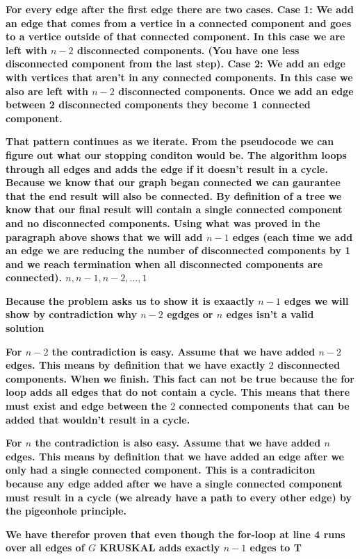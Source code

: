 \documentclass[addpoints]{exam}
\def\mysolution#1{}    %
\begin{document}
\begin{questions}
\textbf{For every edge after the first edge there are two cases. Case 1: We add an edge that comes from a vertice in a connected component and goes to a vertice outside of that connected component. In this case we are left with $n-2$ disconnected components. (You have one less disconnected component from the last step). Case 2: We add an edge with vertices that aren't in any connected components. In this case we also are left with $n-2$ disconnected components. Once we add an edge between 2 disconnected components they become 1 connected component.}

\textbf{That pattern continues as we iterate. From the pseudocode we can figure out what our stopping conditon would be. The algorithm loops through all edges and adds the edge if it doesn't result in a cycle. Because we know that our graph began connected we can gaurantee that the end result will also be connected. By definition of a tree we know that our final result will contain a single connected component and no disconnected components. Using what was proved in the paragraph above shows that we will add $n-1$ edges (each time we add an edge we are reducing the number of disconnected components by 1 and we reach termination when all disconnected components are connected). $n,n-1,n-2,...,1$}

\textbf{Because the problem asks us to show it is exaactly $n-1$ edges we will show by contradiction why $n-2$ egdges or $n$ edges isn't a valid solution}

\textbf{For $n-2$ the contradiction is easy. Assume that we have added $n-2$ edges. This means by definition that we have exactly $2$ disconnected components. When we finish. This fact can not be true because the for loop adds all edges that do not contain a cycle. This means that there must exist and edge between the $2$ connected components that can be added that wouldn't result in a cycle.}

\textbf{For $n$ the contradiction is also easy. Assume that we have added $n$ edges. This means by definition that we have added an edge after we only had a single connected component. This is a contradiciton because any edge added after we have a single connected component must result in a cycle (we already have a path to every other edge) by the pigeonhole principle.}

\textbf{We have therefor proven that even though the for-loop at line 4 runs over all edges of $G$ KRUSKAL adds exactly $n-1$ edges to T}

\mysolution{

}


\end{questions}
\end{document}

